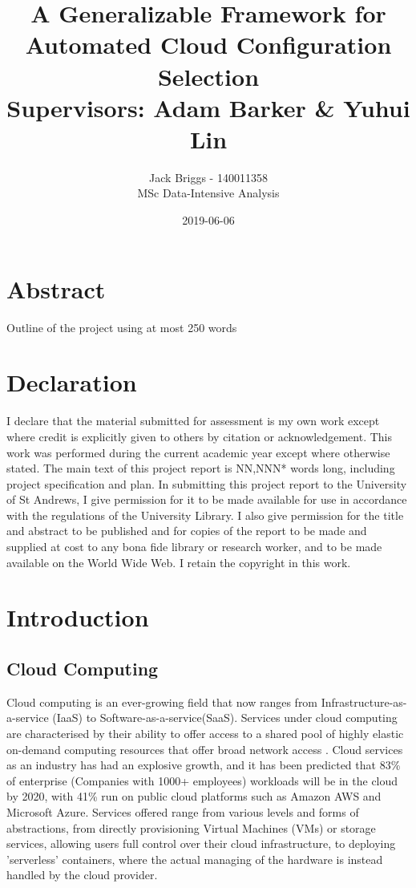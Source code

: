 \documentclass{report}
\title{\vspace{-2.0cm} A Generalizable Framework for Automated Cloud Configuration Selection \\ \vspace{0.5cm} \large Supervisors: Adam Barker \& Yuhui Lin}
\date{2019-06-06}
\author{Jack Briggs - 140011358 \\ MSc Data-Intensive Analysis}
\begin{document}
\maketitle
\newpage
\chapter*{Abstract}
Outline of the project using at most 250 words
\newpage
\chapter*{Declaration}
I declare that the material submitted for assessment
is my own work except where credit is explicitly
given to others by citation or acknowledgement. This
work was performed during the current academic year
except where otherwise stated.
The main text of this project report is NN,NNN* words
long, including project specification and plan.
In submitting this project report to the University of St
Andrews, I give permission for it to be made
available for use in accordance with the regulations of the University Library. I also give permission for the title and abstract to be published and for copies of the report to be made and supplied at cost to any bona fide library or research worker, and to be made available on the World Wide Web. I retain the copyright in this work.
\newpage
\tableofcontents
\listoffigures
\newpage
{}
\chapter{Introduction}
\section{Cloud Computing}
Cloud computing is an ever-growing field that now ranges from Infrastructure-as-a-service (IaaS) to Software-as-a-service(SaaS). Services under cloud computing are characterised by their ability to offer access to a shared pool of highly elastic on-demand computing resources that offer broad network access \cite{Pallis2010, Mell2011}. Cloud services as an industry has had an explosive growth, and it has been predicted that 83\% of enterprise (Companies with 1000+ employees) workloads will be in the cloud by 2020\cite{Intricately2019}, with 41\% run on public cloud platforms such as Amazon AWS and Microsoft Azure. Services offered range from various levels and forms of abstractions, from directly provisioning Virtual Machines (VMs) or storage services, allowing users full control over their cloud infrastructure, to deploying 'serverless' containers, where the actual managing of the hardware is instead handled by the cloud provider.
\end{document}
